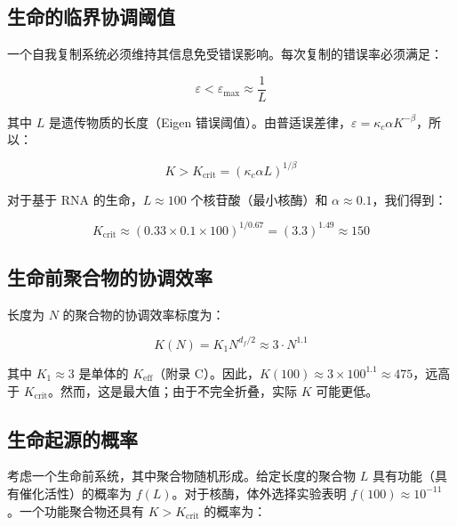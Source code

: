 \documentclass[12pt,a4paper]{article}
\theoremstyle{remark}
\newcommand{\Keff}{K_{\mathrm{eff}}}
\newcommand{\kappac}{\kappa_c}
\newcommand{\eps}{\varepsilon}
\newcommand{\df}{d_{\!f}}
\begin{document}
		\subsection{生命的临界协调阈值}
		
		一个自我复制系统必须维持其信息免受错误影响。每次复制的错误率必须满足：
		
		\begin{equation}
			\eps < \eps_{\text{max}} \approx \frac{1}{L}
			\label{eq:error-threshold}
		\end{equation}
		
		其中 $L$ 是遗传物质的长度（Eigen 错误阈值）\cite{Eigen1971}。由普适误差律，$\eps = \kappac \alpha K^{-\beta}$，所以：
		
		\begin{equation}
			K > K_{\text{crit}} = \left( \kappac \alpha L \right)^{1/\beta}
			\label{eq:Kcrit-life}
		\end{equation}
		
		对于基于 RNA 的生命，$L \approx 100$ 个核苷酸（最小核酶）和 $\alpha \approx 0.1$，我们得到：
		
		\begin{equation}
			K_{\text{crit}} \approx (0.33 \times 0.1 \times 100)^{1/0.67} = (3.3)^{1.49} \approx 150
			\label{eq:Kcrit-life-num}
		\end{equation}
		
		\subsection{生命前聚合物的协调效率}
		
		长度为 $N$ 的聚合物的协调效率标度为：
		
		\begin{equation}
			K(N) = K_1 N^{\df/2} \approx 3 \cdot N^{1.1}
			\label{eq:K-polymer}
		\end{equation}
		
		其中 $K_1 \approx 3$ 是单体的 $\Keff$（附录 C）。因此，$K(100) \approx 3 \times 100^{1.1} \approx 475$，远高于 $K_{\text{crit}}$。然而，这是最大值；由于不完全折叠，实际 $K$ 可能更低。
		
		\subsection{生命起源的概率}
		
		考虑一个生命前系统，其中聚合物随机形成。给定长度的聚合物 $L$ 具有功能（具有催化活性）的概率为 $f(L)$。对于核酶，体外选择实验表明 $f(100) \approx 10^{-11}$ \cite{Joyce2002}。一个功能聚合物还具有 $K > K_{\text{crit}}$ 的概率为：
		
\end{document}
